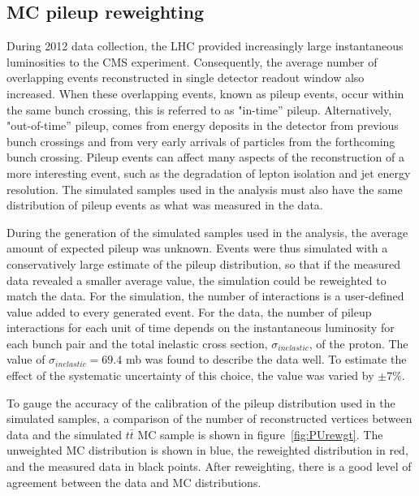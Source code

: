 \subsection{MC pileup reweighting}
\label{mc_pileup_reweight_overview}

\par During 2012 data collection, the LHC provided increasingly
large instantaneous luminosities to the CMS experiment.  Consequently,
the average number of overlapping events reconstructed in single
detector readout window also increased.  When these overlapping
events, known as pileup events, occur within the same bunch crossing,
this is referred to as "in-time'' pileup.  Alternatively,
"out-of-time'' pileup, comes from energy deposits in the detector from
previous bunch crossings and from very early arrivals of particles
from the forthcoming bunch crossing.  Pileup events can affect many
aspects of the reconstruction of a more interesting event, such as the
degradation of lepton isolation and jet energy resolution.  The
simulated samples used in the analysis must also have the same
distribution of pileup events as what was measured in the data.

\par During the generation of the simulated samples used in the
analysis, the average amount of expected pileup was unknown.  Events
were thus simulated with a conservatively large estimate of the pileup
distribution, so that if the measured data revealed a smaller average
value, the simulation could be reweighted to match the data.  
For the simulation, the number of interactions is a user-defined value
added to every generated event.  For the data, the number of pileup
interactions for each unit of time depends on the instantaneous luminosity for each bunch pair and the
total inelastic cross section, $\sigma_{inelastic}$, of the proton.
The value of $\sigma_{inelastic} = 69.4$ mb was found to describe the data
well.  To estimate the effect of the systematic uncertainty of this
choice, the value was varied by $\pm 7\%$.  

\par To gauge the accuracy of the calibration of the pileup
distribution used in the simulated samples, a comparison of the
number of reconstructed vertices between data and the simulated
$t\bar{t}$ MC sample is shown in figure~\ref{fig:PUrewgt}.  The
unweighted MC distribution is shown in blue, the reweighted
distribution in red, and the measured data in black points.  After
reweighting, there is a good level of agreement between the data and
MC distributions.  

